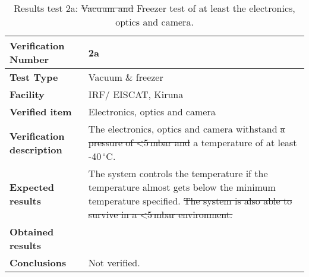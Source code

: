 \begin{table}[H]
\centering

\begin{tabular}{|m{}| m{} |}
\hline
\textbf{Verification Number} 		& 2a 							 \\ \hline
\textbf{Test Type} 					& Vacuum \& freezer				 \\ \hline
\textbf{Facility} 					& IRF/ EISCAT, Kiruna 			 \\ \hline
\textbf{Verified item} 				& Electronics, optics and camera \\ \hline

\textbf{Verification description} 	& The electronics, optics and camera withstand \st{a pressure of <5\,mbar and} a temperature of at least -40\,$^\circ$C. \\ \hline

\textbf{Expected results} 			& The system controls the temperature if the temperature almost gets below the minimum temperature specified. \st{The system is also able to survive in a <5\,mbar environment.}\\ \hline

\textbf{Obtained results} 			& \\ \hline

\textbf{Conclusions} 				& Not verified.		\\ \hline
\end{tabular}
\caption{Results test 2a: \st{Vacuum and} Freezer test of at least the electronics, optics and camera.}
\label{tab:testresult2:thermal}
\end{table}


\raggedbottom